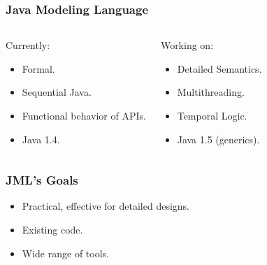 \begin{frame}
\frametitle{Java Modeling Language}
\begin{columns}[t]
\begin{block}{Currently:}
\begin{itemize}
\item
Formal.

\item 
Sequential Java.

\item
Functional behavior of APIs.

\item
Java 1.4.
\end{itemize}
\end{block}

\pause

\begin{block}{Working on:}
\begin{itemize}
\item
Detailed Semantics.

\item 
Multithreading.

\item
Temporal Logic.

\item
Java 1.5 (generics).
\end{itemize}
\end{block}
\end{columns}
\end{frame}

\begin{frame}
\frametitle{JML's Goals}
\begin{itemize}
\item
Practical, effective for detailed designs.

\item
Existing code.

\item
Wide range of tools.
\end{itemize}
\end{frame}

